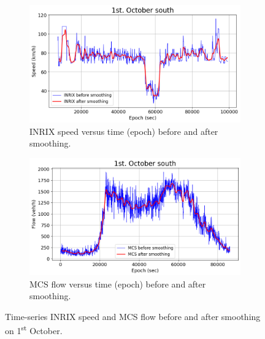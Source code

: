 \documentclass[english]{kththesis}
\begin{document}
\begin{figure}[!ht]
    \centering
    \begin{subfigure}{0.7\textwidth}
        \centering
        \includegraphics[width=\textwidth]{smoothing_inrix_speed.png}
        \caption{INRIX speed versus time (epoch) before and after smoothing.}
    \end{subfigure}
    \hfill
    \begin{subfigure}{0.7\textwidth}
        \centering
        \includegraphics[width=\textwidth]{smoothing_mcs_flow.png}
        \caption{MCS flow versus time (epoch) before and after smoothing.}
    \end{subfigure}
    \caption{Time-series INRIX speed and MCS flow before and after smoothing on 1\textsuperscript{st} October.}
    \label{fig:smoothing}
\end{figure}
\end{document}
